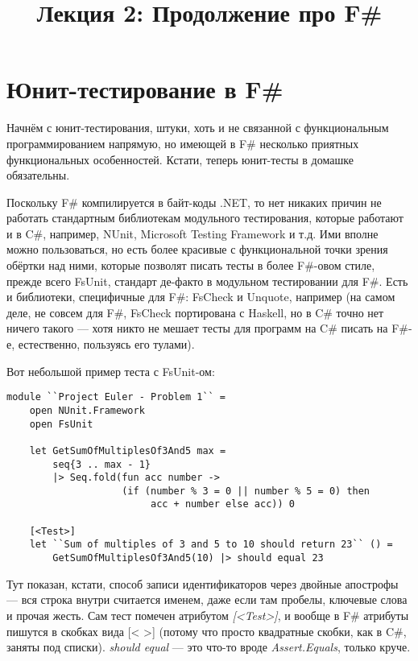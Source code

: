\documentclass[a5paper]{article}
\title{Лекция 2: Продолжение про F\#}
\date{}
\begin{document}
\maketitle
\thispagestyle{empty}

\section{Юнит-тестирование в F\#}

Начнём с юнит-тестирования, штуки, хоть и не связанной с функциональным программированием напрямую, но имеющей в F\# несколько приятных функциональных особенностей. Кстати, теперь юнит-тесты в домашке обязательны.

Поскольку F\# компилируется в байт-коды .NET, то нет никаких причин не работать стандартным библиотекам модульного тестирования, которые работают и в C\#, например, NUnit, Microsoft Testing Framework и т.д. Ими вполне можно пользоваться, но есть более красивые с функциональной точки зрения обёртки над ними, которые позволят писать тесты в более F\#-овом стиле, прежде всего FsUnit, стандарт де-факто в модульном тестировании для F\#. Есть и библиотеки, специфичные для F\#: FsCheck и Unquote, например (на самом деле, не совсем для F\#, FsCheck портирована с Haskell, но в C\# точно нет ничего такого --- хотя никто не мешает тесты для программ на C\# писать на F\#-е, естественно, пользуясь его тулами).

Вот небольшой пример теста с FsUnit-ом:

\begin{verbatim}
module ``Project Euler - Problem 1`` =
    open NUnit.Framework
    open FsUnit

    let GetSumOfMultiplesOf3And5 max =
        seq{3 .. max - 1} 
        |> Seq.fold(fun acc number ->
                    (if (number % 3 = 0 || number % 5 = 0) then
                         acc + number else acc)) 0

    [<Test>]
    let ``Sum of multiples of 3 and 5 to 10 should return 23`` () =
        GetSumOfMultiplesOf3And5(10) |> should equal 23
\end{verbatim}

Тут показан, кстати, способ записи идентификаторов через двойные апострофы --- вся строка внутри считается именем, даже если там пробелы, ключевые слова и прочая жесть. Сам тест помечен атрибутом \textit{[<Test>]}, и вообще в F\# атрибуты пишутся в скобках вида [< >] (потому что просто квадратные скобки, как в C\#, заняты под списки). \textit{should equal} --- это что-то вроде \textit{Assert.Equals}, только круче.
\end{document}
